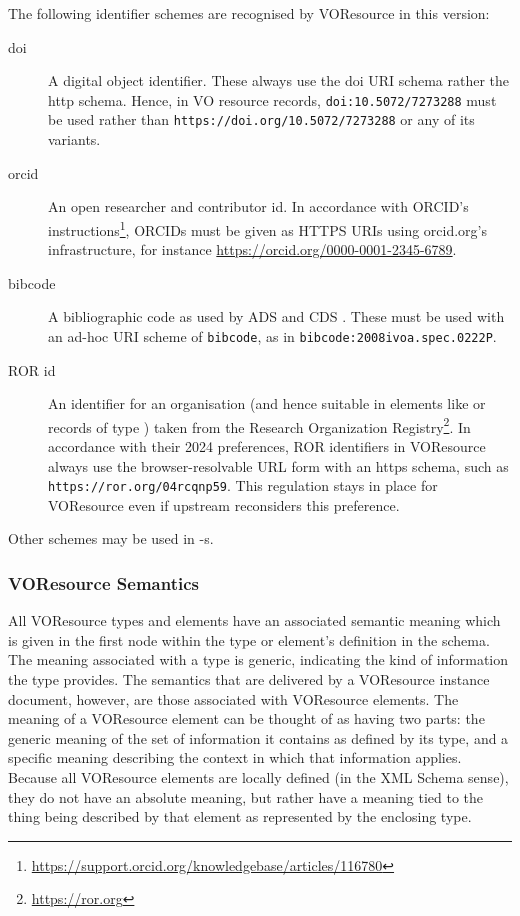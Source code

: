 \documentclass[11pt,a4paper]{ivoa}
\begin{document}
The following identifier schemes are recognised by VOResource in this
version:

\begin{description}
\item[doi] A digital object identifier.  These always use the doi URI
schema rather the http schema.  Hence, in VO resource records,
\verb|doi:10.5072/7273288| must be used rather than
\nolinkurl{https://doi.org/10.5072/7273288} or any of its variants.

\item[orcid] An open researcher and contributor id. In
accordance with ORCID's
instructions\footnote{\url{https://support.orcid.org/knowledgebase/articles/116780}}, ORCIDs must be given
as HTTPS URIs using orcid.org's infrastructure, for instance
\url{https://orcid.org/0000-0001-2345-6789}.

\item[bibcode] A bibliographic code as used by
ADS and CDS \citep{1995ASSL..203..259S}.  These
must be used with an ad-hoc URI scheme of \verb|bibcode|, as in
\verb|bibcode:2008ivoa.spec.0222P|.

\item[ROR id] An identifier for an organisation (and hence suitable in
elements like  or records of type
) taken from the Research Organization
Registry\footnote{\url{https://ror.org}}.  In accordance with their 2024
preferences, ROR identifiers in VOResource always use the
browser-resolvable URL form with an https schema, such as
\nolinkurl{https://ror.org/04rcqnp59}.  This regulation stays in place
for VOResource even if upstream reconsiders this preference.
\end{description}

Other schemes may be used in -s.

\subsubsection{VOResource Semantics}

All VOResource types and elements have an associated semantic meaning
which is given in the first 
node within the type or element's definition in the schema.  The
meaning associated with a type is generic, indicating the kind of
information the type provides.  The semantics that are delivered by a
VOResource instance document, however, are those associated with
VOResource elements.  The meaning of a VOResource element can be
thought of as having two parts:  the generic meaning of the set of
information it contains as defined by its type, and a specific meaning
describing the context in which that information applies.  Because all
VOResource elements are locally defined (in the XML Schema
sense), they do not have an absolute meaning, but rather have a
meaning tied to the thing being described by that element as
represented by the enclosing type.
\end{document}
